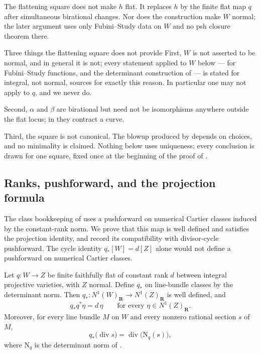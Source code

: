 \begin{remark}
\label{rem:ch41-flatification-safeguard}
The flattening square does not make $h$ flat.  It replaces $h$ by the
finite flat map $q$ after simultaneous birational changes.  Nor does the
construction make $W$ normal; the later argument uses only
Fubini--Study data on $W$ and no psh closure theorem there.
\end{remark}

\begin{warning}{Three things the flattening square does not provide}
\label{warn:ch41-flattening-scope}
First, $W$ is not asserted to be normal, and in general it is not; every
statement applied to $W$ below ---  for
Fubini--Study functions, and the determinant construction of
 --- is stated for integral, not normal, sources
for exactly this reason.  In particular one may not apply
 to $q$, and we never do.

Second, $\alpha$ and $\beta$ are birational but need not be
isomorphisms anywhere outside the flat locus; in
 they contract a curve.

Third, the square is not canonical.  The blowup produced by
 depends on choices, and no minimality is claimed.
Nothing below uses uniqueness; every conclusion is drawn for one square,
fixed once at the beginning of the proof of
.
\end{warning}

\subsection{Ranks, pushforward, and the projection formula}
\label{sec:ch41-projection}

The class bookkeeping of  uses a pushforward
on numerical Cartier classes induced by the constant-rank norm.
We prove that this map is well defined and satisfies the projection
identity, and record its compatibility with divisor-cycle pushforward.
The cycle identity $q_*[W]=d[Z]$ alone would not define a pushforward
on numerical Cartier classes.

\begin{lemma}
\label{lem:ch41-projection-formula}
Let $q:W\to Z$ be finite faithfully flat of constant rank $d$ between
integral projective varieties, with $Z$ normal.  Define $q_*$
on line-bundle classes by the determinant norm.  Then $q_*:N^1(W)_{\mathbf R}\to
N^1(Z)_{\mathbf R}$ is well defined, and
\[
 q_*q^*\eta=d\,\eta
 \qquad\text{for every }\eta\in N^1(Z)_{\mathbf R}.
\tag{41.15}\label{eq:ch41-projection-formula}
\]
Moreover, for every line bundle $M$ on $W$ and every nonzero rational
section $s$ of $M$,
\[
 q_*\bigl(\operatorname{div}s\bigr)
 =\operatorname{div}\bigl(\mathrm N_q(s)\bigr),
\]
where $\mathrm N_q$ is the determinant norm of
.
\end{lemma}

